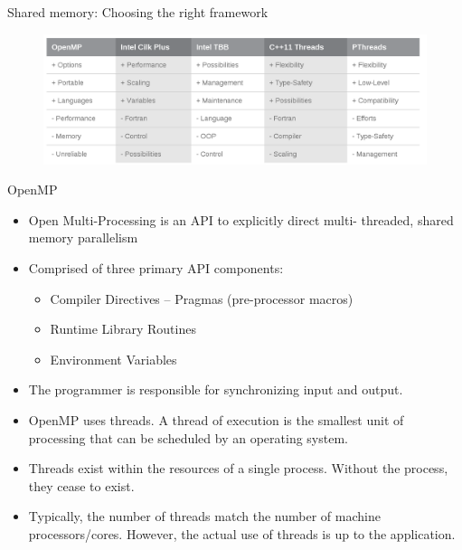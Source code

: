 \documentclass[10pt,times]{beamer}
\begin{document}
\begin{frame}{Shared memory: Choosing the right framework}

\begin{figure}
\includegraphics[width=\linewidth]{figs/shared_memory_comparison.png}
\end{figure}
\end{frame}

\begin{frame}{OpenMP}
\begin{itemize}
\item Open Multi-Processing is an API to explicitly direct multi-
threaded, shared memory parallelism
\item Comprised of three primary API components:
\begin{itemize}
\item Compiler Directives – Pragmas (pre-processor macros)
\item Runtime Library Routines
\item Environment Variables
\end{itemize}
\item The programmer is responsible for synchronizing input and
output.
\item OpenMP uses threads. A thread of execution is the smallest unit of processing 
that can be scheduled by an operating system.
\item Threads exist within the resources of a single process. Without
the process, they cease to exist.
\item Typically, the number of threads match the number of machine
processors/cores. However, the actual use of threads is up to the
application.
\end{itemize}
\end{frame}
\end{document}
